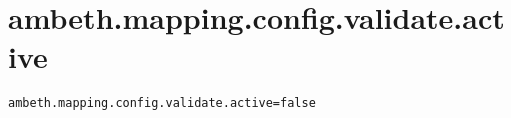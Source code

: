 \section{ambeth.mapping.config.validate.active}
\label{configuration:AmbethMappingConfigValidateActive}
\AvailableInJavaAndCsharp{\TODO}
\begin{lstlisting}[style=Props,caption={Usage example for \textit{ambeth.mapping.config.validate.active}}]
ambeth.mapping.config.validate.active=false
\end{lstlisting}